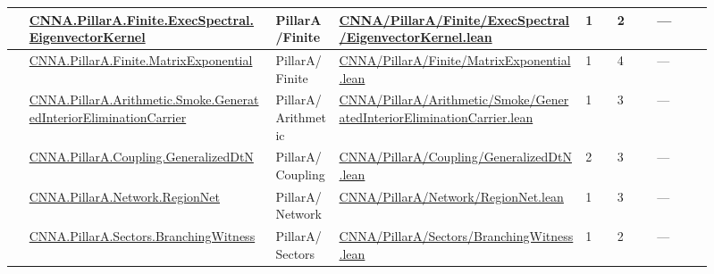 \begin{longtable}{L{0.025\linewidth} L{0.315\linewidth} L{0.08\linewidth} L{0.315\linewidth} L{0.045\linewidth} L{0.055\linewidth} L{0.07\linewidth}}
\hline
{} & \href{run:repo_snapshot/CNNA/PillarA/Finite/ExecSpectral/EigenvectorKernel.lean}{CNNA.\allowbreak{}PillarA.\allowbreak{}Finite.\allowbreak{}ExecSpectral.\allowbreak{}EigenvectorKernel} & PillarA/\allowbreak{}Finite & \href{run:repo_snapshot/CNNA/PillarA/Finite/ExecSpectral/EigenvectorKernel.lean}{CNNA/\allowbreak{}PillarA/\allowbreak{}Finite/\allowbreak{}ExecSpectral/\allowbreak{}EigenvectorKernel.\allowbreak{}lean} & 1 & 2 & ---\\
\hline
{} & \href{run:repo_snapshot/CNNA/PillarA/Finite/MatrixExponential.lean}{CNNA.\allowbreak{}PillarA.\allowbreak{}Finite.\allowbreak{}MatrixExponential} & PillarA/\allowbreak{}Finite & \href{run:repo_snapshot/CNNA/PillarA/Finite/MatrixExponential.lean}{CNNA/\allowbreak{}PillarA/\allowbreak{}Finite/\allowbreak{}MatrixExponential.\allowbreak{}lean} & 1 & 4 & ---\\
\hline
{} & \href{run:repo_snapshot/CNNA/PillarA/Arithmetic/Smoke/GeneratedInteriorEliminationCarrier.lean}{CNNA.\allowbreak{}PillarA.\allowbreak{}Arithmetic.\allowbreak{}Smoke.\allowbreak{}GeneratedInteriorEliminationCarrier} & PillarA/\allowbreak{}Arithmetic & \href{run:repo_snapshot/CNNA/PillarA/Arithmetic/Smoke/GeneratedInteriorEliminationCarrier.lean}{CNNA/\allowbreak{}PillarA/\allowbreak{}Arithmetic/\allowbreak{}Smoke/\allowbreak{}GeneratedInteriorEliminationCarrier.\allowbreak{}lean} & 1 & 3 & ---\\
\hline
{} & \href{run:repo_snapshot/CNNA/PillarA/Coupling/GeneralizedDtN.lean}{CNNA.\allowbreak{}PillarA.\allowbreak{}Coupling.\allowbreak{}GeneralizedDtN} & PillarA/\allowbreak{}Coupling & \href{run:repo_snapshot/CNNA/PillarA/Coupling/GeneralizedDtN.lean}{CNNA/\allowbreak{}PillarA/\allowbreak{}Coupling/\allowbreak{}GeneralizedDtN.\allowbreak{}lean} & 2 & 3 & ---\\
\hline
{} & \href{run:repo_snapshot/CNNA/PillarA/Network/RegionNet.lean}{CNNA.\allowbreak{}PillarA.\allowbreak{}Network.\allowbreak{}RegionNet} & PillarA/\allowbreak{}Network & \href{run:repo_snapshot/CNNA/PillarA/Network/RegionNet.lean}{CNNA/\allowbreak{}PillarA/\allowbreak{}Network/\allowbreak{}RegionNet.\allowbreak{}lean} & 1 & 3 & ---\\
\hline
{} & \href{run:repo_snapshot/CNNA/PillarA/Sectors/BranchingWitness.lean}{CNNA.\allowbreak{}PillarA.\allowbreak{}Sectors.\allowbreak{}BranchingWitness} & PillarA/\allowbreak{}Sectors & \href{run:repo_snapshot/CNNA/PillarA/Sectors/BranchingWitness.lean}{CNNA/\allowbreak{}PillarA/\allowbreak{}Sectors/\allowbreak{}BranchingWitness.\allowbreak{}lean} & 1 & 2 & ---\\

\end{longtable}
